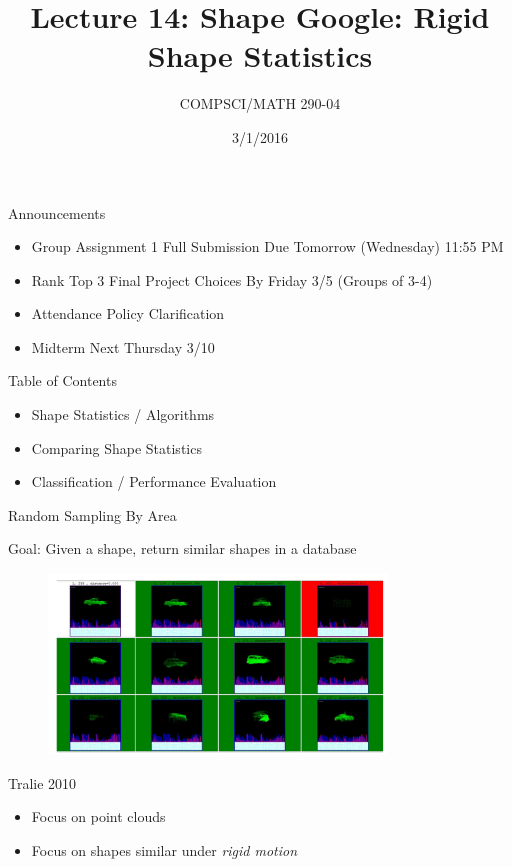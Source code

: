\documentclass{beamer}
\title{Lecture 14: Shape Google: Rigid Shape Statistics}
\date{3/1/2016}
\institute{Chris Tralie, Duke University}
\author{COMPSCI/MATH 290-04}
\begin{document}
\frame{\titlepage}

\begin{frame}{Announcements}
\begin{itemize}[label=$\vartriangleright$]

\item Group Assignment 1 Full Submission Due Tomorrow (Wednesday) 11:55 PM

\item Rank Top 3 Final Project Choices By Friday 3/5 (Groups of 3-4)

\item Attendance Policy Clarification

\item Midterm Next Thursday 3/10

\end{itemize}

\end{frame}

\begin{frame}{Table of Contents}
\begin{itemize}[label=$\blacktriangleright$]
	\item Shape Statistics / Algorithms
\end{itemize}
\begin{itemize}[label=$\vartriangleright$]
	\item Comparing Shape Statistics
\end{itemize}
\begin{itemize}[label=$\vartriangleright$]
	\item Classification / Performance Evaluation
\end{itemize}
\end{frame}


\begin{frame}{Random Sampling By Area}

Goal: Given a shape, return similar shapes in a database

\begin{figure}[t]
	\centering
    \includegraphics[width=0.8\textwidth]{ShapeGoogle.png}
\end{figure}
\small Tralie 2010

\begin{itemize}[label=$\vartriangleright$]
\item Focus on point clouds
\item Focus on shapes similar under {\em rigid motion}
\end{itemize}

\end{frame}
\end{document}
